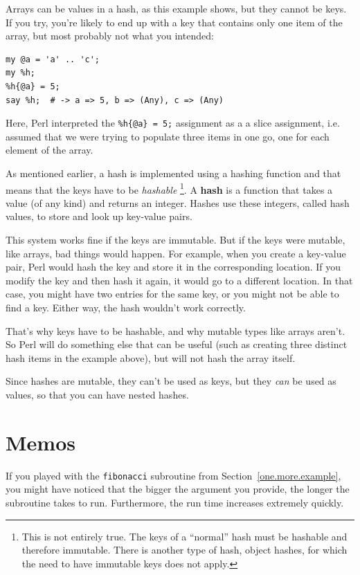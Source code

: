 Arrays can be values in a hash, as this example shows, but they
cannot be keys.  If you try, you're likely to end up with a 
key that contains only one item of the array, but most probably 
not what you intended:

\begin{verbatim}
my @a = 'a' .. 'c';
my %h;
%h{@a} = 5;
say %h;  # -> a => 5, b => (Any), c => (Any)
\end{verbatim}

Here, Perl interpreted the \verb'%h{@a} = 5;' assignment 
as a a slice assignment, i.e. assumed that we were 
trying to populate three items in one go, one for each 
element of the array.

As mentioned earlier, a hash is implemented using
a hashing function and that means that the keys have to 
be \emph{hashable} \footnote{This is not entirely true. The 
keys of a ``normal'' hash must be hashable and therefore 
immutable. There is another type of hash, object hashes, 
for which the need to have immutable keys does not apply.}. 
A {\bf hash} is a function that takes 
a value (of any kind) and returns an integer.  Hashes use 
these integers, called hash values, to store and look up 
key-value pairs.

This system works fine if the keys are immutable.  But if the
keys were mutable, like arrays, bad things would happen. For example,
when you create a key-value pair, Perl would hash the key and 
store it in the corresponding location.  If you modify the
key and then hash it again, it would go to a different location.
In that case, you might have two entries for the same key,
or you might not be able to find a key.  Either way, the
hash wouldn't work correctly.

That's why keys have to be hashable, and why mutable types like
arrays aren't. So Perl will do something else that can be 
useful (such as creating three distinct hash items in the 
example above), but will not hash the array itself.

Since hashes are mutable, they can't be used as keys,
but they {\em can} be used as values, so that you can 
have nested hashes.

\section{Memos}
\label{memoize}

If you played with the {\tt fibonacci} subroutine from
Section~\ref{one.more.example}, you might have noticed that 
the bigger the argument you provide, the longer the 
subroutine takes to run. Furthermore, the run time 
increases extremely quickly.

